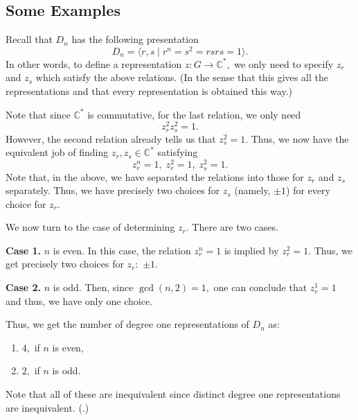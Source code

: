 \subsection{Some Examples}
\begin{ex} \label{ex:degonerepsDn}
	Recall that $D_n$ has the following presentation
	\begin{equation*} 
		D_n = \langle r, s \mid r^n = s^2 = rsrs = 1\rangle.
	\end{equation*}
	In other words, to define a representation $z : G \to \mathbb{C}^*,$ we only need to specify $z_r$ and $z_s$ which satisfy the above relations. (In the sense that this gives all the representations and that every representation is obtained this way.)

	Note that since $\mathbb{C}^*$ is commutative, for the last relation, we only need
	\begin{equation*} 
		z_r^2z_s^2 = 1.
	\end{equation*}
	However, the second relation already tells us that $z_s^2 = 1.$ Thus, we now have the equivalent job of finding $z_r, z_s \in \mathbb{C}^*$ satisfying
	\begin{equation*} 
		z_r^n = 1,\;z_r^2 = 1,\; z_s^2 = 1.
	\end{equation*}
	Note that, in the above, we have separated the relations into those for $z_r$ and $z_s$ separately. Thus, we have precisely two choices for $z_s$ (namely, $\pm 1$) for every choice for $z_r.$

	We now turn to the case of determining $z_r.$ There are two cases.

	\textbf{Case 1.} $n$ is even. In this case, the relation $z_r^n = 1$ is implied by $z_r^2 = 1.$ Thus, we get precisely two choices for $z_r:$ $\pm 1.$

	\textbf{Case 2.} $n$ is odd. Then, since $\gcd(n, 2) = 1,$ one can conclude that $z_r^{1} = 1$ and thus, we have only one choice.

	Thus, we get the number of degree one representations of $D_n$ as:
	\begin{enumerate}
		\item $4,$ if $n$ is even,
		\item $2,$ if $n$ is odd.
	\end{enumerate}

	Note that all of these are inequivalent since distinct degree one representations are inequivalent. (.)
\end{ex}

